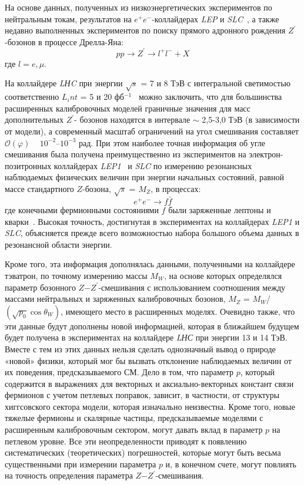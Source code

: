 На основе данных, полученных из низкоэнергетических экспериментов по нейтральным токам, результатов на $e^+e^-$-коллайдерах \textit{LEP} и \textit{SLC}~\cite{Bobovnikov:2016}, а также недавно выполненных экспериментов по поиску прямого адронного рождения $Z^\prime$-бозонов в процессе Дрелла-Яна:
\begin{equation} \label{eq:drell}
	pp \rightarrow Z^\prime \rightarrow l^+l^- + X
\end{equation}
где $l=e,\mu$. 

На коллайдере \textit{LНC} при энергии $\sqrt{s}$ = 7 и 8 ТэВ с интегральной светимостью соответственно $L_int$ = 5 и 20 фб${}^{-1}$~\cite{Bobovnikov:2016} можно заключить, что для большинства расширенных калибровочных моделей граничные значения для масс дополнительных $Z^\prime$- бозонов находятся в интервале $\sim$ 2,5-3,0 ТэВ (в зависимости от модели), а современный масштаб ограничений на угол смешивания составляет $\mathcal{O}(\varphi )$ ~ ${10}^{-2}$--${10}^{-3}$ рад. При этом наиболее точная информация об угле смешивания была получена преимущественно из экспериментов на электрон-позитронных коллайдерах \textit{LEP1}~\cite{schael:2006} и \textit{SLC} по измерению резонансных наблюдаемых физических величин при энергии начальных состояний, равной массе стандартного $Z$-бозона, $\sqrt{s}$ = $M_Z$, в процессах:
\begin{equation} \label{eq:drell2}
	e^+e^- \rightarrow f\bar{f}
\end{equation}
где конечными фермионными состояниями $f$ были заряженные лептоны и кварки~\cite{andreev-pankov:2012}. Высокая точность, достигнутая в экспериментах на коллайдерах \textit{LEP1} и \textit{SLC}, объясняется прежде всего возможностью набора большого объема данных в резонансной области энергии.

Кроме того, эта информация дополнялась данными, полученными на коллайдере тэватрон, по точному измерению массы $M_W$, на основе которых определялся параметр бозонного $Z$−$Z^\prime$-смешивания с использованием соотношения между массами нейтральных и заряженных калибровочных бозонов, $M_Z$ = $M_W$/$(\sqrt{p_0}\cos\theta_W)$, имеющего место в расширенных моделях. Очевидно также, что эти данные будут дополнены новой информацией, которая в ближайшем будущем будет получена в экспериментах на коллайдере \textit{LНС} при энергии 13 и 14 ТэВ. Вместе с тем из этих данных нельзя сделать однозначный вывод о природе «новой» физики, который мог бы вызвать отклонение наблюдаемых величин от их поведения, предсказываемого СМ. Дело в том, что параметр $p$, который содержится в выражениях для векторных и аксиально-векторных констант связи фермионов с учетом петлевых поправок, зависит, в частности, от структуры хиггсовского сектора модели, которая изначально неизвестна. Кроме того, новые тяжелые фермионы и скалярные частицы, предсказываемые моделями с расширенным калибровочным сектором, могут давать вклад в параметр $p$ на петлевом уровне. Все эти неопределенности приводят к появлению систематических (теоретических) погрешностей, которые могут быть весьма существенными при измерении параметра $p$ и, в конечном счете, могут повлиять на точность определения параметра $Z$−$Z^\prime$-смешивания.

